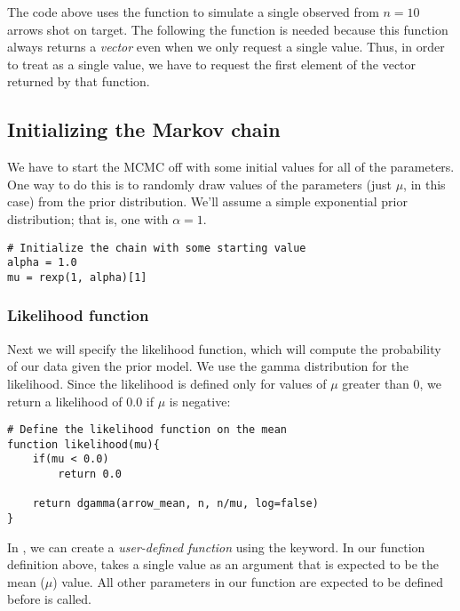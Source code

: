 The \Rev code above uses the  function to simulate a single observed  from $n=10$ arrows shot on target.
The \cl{[1]} following the  function is needed because this function always returns a \emph{vector} even when we only request a single value. Thus, in order to treat  as a single value, we have to request the first element of the vector returned by that function.


\subsection{Initializing the Markov chain}
We have to start the MCMC off with some initial values for all of the parameters.
One way to do this is to randomly draw values of the parameters (just $\mu$, in this case) from the prior distribution.
We'll assume a simple exponential prior distribution; that is, one with $\alpha = 1$.
{\tt \begin{snugshade*}
\begin{lstlisting}
# Initialize the chain with some starting value
alpha = 1.0
mu = rexp(1, alpha)[1]
\end{lstlisting}
\end{snugshade*}}



\subsubsection{Likelihood function}
Next we will specify the likelihood function, which will compute the probability of our data given the prior model.
We use the gamma distribution for the likelihood. Since the likelihood is defined only for values of $\mu$ greater than 0, we return a likelihood of 0.0 if $\mu$ is negative:
{\tt \begin{snugshade*}
\begin{lstlisting}
# Define the likelihood function on the mean 
function likelihood(mu){
    if(mu < 0.0)
        return 0.0

    return dgamma(arrow_mean, n, n/mu, log=false)
}
\end{lstlisting}
\end{snugshade*}}

In \Rev, we can create a {\em user-defined function} using the  keyword. In our function definition above,  takes a single value as an argument that is expected to be the mean ($\mu$) value.
All other parameters in our function are expected to be defined before  is called.


